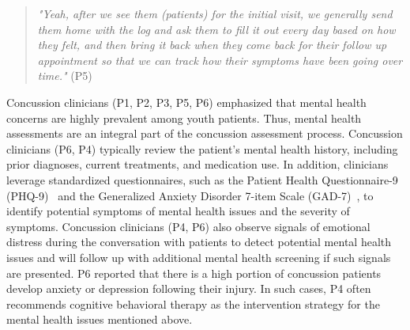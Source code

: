\begin{quote}
    \textit{"Yeah, after we see them (patients) for the initial visit, we generally send them home with the log and ask them to fill it out every day based on how they felt, and then bring it back when they come back for their follow up appointment so that we can track how their symptoms have been going over time."} (P5)
\end{quote}
Concussion clinicians (P1, P2, P3, P5, P6) emphasized that mental health concerns are highly prevalent among youth patients. Thus, mental health assessments are an integral part of the concussion assessment process. 
Concussion clinicians (P6, P4) typically review the patient’s mental health history, including prior diagnoses, current treatments, and medication use. 
In addition, clinicians leverage standardized questionnaires, such as the Patient Health Questionnaire-9 (PHQ-9)~\cite{levis2019accuracy} and the Generalized Anxiety Disorder 7-item Scale (GAD-7)~\cite{mossman2017generalized}, to identify potential symptoms of mental health issues and the severity of symptoms. 
Concussion clinicians (P4, P6) also observe signals of emotional distress during the conversation with patients to detect potential mental health issues and will follow up with additional mental health screening if such signals are presented.
P6 reported that there is a high portion of concussion patients develop anxiety or depression following their injury. 
In such cases, P4 often recommends cognitive behavioral therapy as the intervention strategy for the mental health issues mentioned above. 

